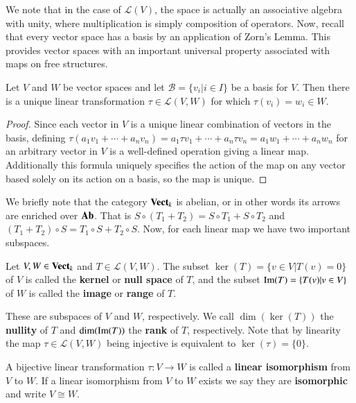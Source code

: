 We note that in the case of $\mathcal{L}(V)$, the space is actually an associative algebra with unity, where multiplication is simply composition of operators. Now, recall that every vector space has a basis by an application of Zorn's Lemma. This provides vector spaces with an important universal property associated with maps on free structures.

\begin{theorem}
    Let $V$ and $W$ be vector spaces and let $\mathcal{B} = \{v_i|i \in I\}$ be a basis for $V$. Then there is a unique linear transformation $\tau \in \mathcal{L}(V,W)$ for which $\tau(v_i) = w_i \in W$.
\end{theorem}
\begin{proof}
    Since each vector in $V$ is a unique linear combination of vectors in the basis, defining $\tau(a_1v_1+\cdots+a_nv_n) = a_1\tau v_1+\cdots + a_n\tau v_n = a_1w_1+\cdots + a_nw_n$ for an arbitrary vector in $V$ is a well-defined operation giving a linear map. Additionally this formula uniquely specifies the action of the map on any vector based solely on its action on a basis, so the map is unique.
\end{proof}

We briefly note that the category $\normalfont\textbf{Vect}_{k}$ is abelian, or in other words its arrows are enriched over $\normalfont\textbf{Ab}$. That is $S\circ (T_1+T_2) = S\circ T_1+S\circ T_2$ and $(T_1+T_2)\circ S = T_1\circ S+T_2\circ S$. Now, for each linear map we have two important subspaces.

\begin{definition}
    Let $V,W \in \normalfont\textbf{Vect}_{k}$ and $T \in \mathcal{L}(V,W)$. The subset $\ker(T) = \{v \in V|T(v) = 0\}$ of $V$ is called the \textbf{kernel} or \textbf{null space} of $T$, and the subset $\operatorname{Im}(T) = \{T(v)| v \in V\}$ of $W$ is called the \textbf{image} or \textbf{range} of $T$.
\end{definition}

These are subspaces of $V$ and $W$, respectively. We call $\dim(\ker(T))$ the \textbf{nullity} of $T$ and $\dim(\operatorname{Im}(T))$ the \textbf{rank} of $T$, respectively. Note that by linearity the map $\tau\in\mathcal{L}(V,W)$ being injective is equivalent to $\ker(\tau) = \{0\}$.

\begin{definition}
    A bijective linear transformation $\tau:V\rightarrow W$ is called a \textbf{linear isomorphism} from $V$ to $W$. If a linear isomorphism from $V$ to $W$ exists we say they are \textbf{isomorphic} and write $V\cong W$.
\end{definition}

